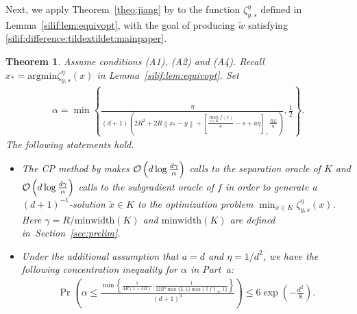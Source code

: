 \documentclass[11pt,letterpaper]{article}
\newcommand{\norm}[1]{\left\lVert #1 \right\rVert}
\newcommand{\argmin}{\mathrm{argmin}  }
\newcommand{\brac}[1]{\left( #1\right)}
\newtheorem{theorem}[thm]{Theorem}
\begin{document}
Next, we apply Theorem~\ref{theo:jiang} by \cite{jiang2020cuttingplane} to the function $\zeta^{\eta}_{y,s}$ defined in Lemma~\ref{silif:lem:equivopt}, with the goal of producing $\tilde{w}$ satisfying \eqref{silif:difference:tildextildet:mainpaper}. 

\begin{theorem}
\label{silif:theo:cuttingplane} 
Assume conditions (A1), (A2) and (A4). Recall $x_*=\argmin \zeta^{\eta}_{y,s}(x)$ in Lemma~\ref{silif:lem:equivopt}. Set
    \begin{align}
    \label{silif:def:alpha}
        \alpha=\min\left\{\frac{\eta}{(d+1)\brac{2R^2+2R\norm{x_*-y}+ \left[\frac{\max_{x\in K}f(x)}{a}-s+a\eta\right]_{+}\frac{RL}{a} }},\frac{1}{2}\right\}. 
    \end{align}
The following statements hold. 
\begin{itemize}
    \item[(a)] The CP method by \cite{jiang2020cuttingplane} makes ${\cal O}\left(d \log \frac{d \gamma}{\alpha}\right)$ calls to the separation oracle of $K$ and ${\cal O}\left(d \log \frac{d \gamma}{\alpha}\right)$ calls to the subgradient oracle of $f$ in order to generate a $(d+1)^{-1}$-solution $\tilde{x}\in K$ to the optimization problem $\min_{x\in K} \zeta^{\eta}_{y,s}(x)$. Here $\gamma=R/\mbox{minwidth}(K)$ and $\mbox{minwidth}(K)$ are defined in~Section~\ref{sec:prelim}. 
    \item[(b)] Under the additional assumption that $a=d$ and $\eta=1/d^2$,  we have  the following concentration inequality for $\alpha$ in Part~a:
 \begin{align*}
     \Pr\brac{\alpha\leq \frac{\min\left\{\frac{1}{4R(1+3R)}, \frac{1}{12R^2 \max\{L,1\}\max\{\norm{f}_\infty,1\} }\right\} }{(d+1)^3}}\leq 6\exp\brac{-\frac{d^2}{8}}. 
 \end{align*}
\end{itemize}
\end{theorem}
\end{document}
